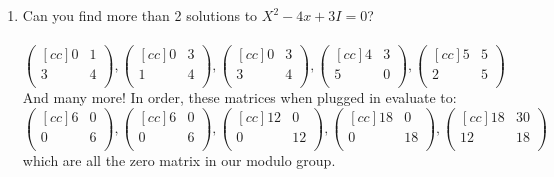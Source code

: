 \begin{enumerate}
\begin{enumerate}
        \item Can you find more than 2 solutions to $X^2 - 4x + 3I = 0$?\\\\
$$          
      \begin{pmatrix}[cc]
        0 & 1 \\
        3 & 4 \\
      \end{pmatrix}, 
      \begin{pmatrix}[cc]
        0 & 3 \\
        1 & 4 \\
      \end{pmatrix},
      \begin{pmatrix}[cc]
        0 & 3 \\
        3 & 4 \\
      \end{pmatrix},
      \begin{pmatrix}[cc]
        4 & 3 \\
        5 & 0 \\
      \end{pmatrix},
      \begin{pmatrix}[cc]
        5 & 5 \\
        2 & 5 \\
      \end{pmatrix}
$$
And many more! In order, these matrices when plugged in evaluate to:
$$
      \begin{pmatrix}[cc]
        6 & 0 \\
        0 & 6 \\
      \end{pmatrix}, 
      \begin{pmatrix}[cc]
        6 & 0 \\
        0 & 6 \\
      \end{pmatrix},
      \begin{pmatrix}[cc]
        12 & 0 \\
        0 & 12 \\
      \end{pmatrix},
      \begin{pmatrix}[cc]
        18 & 0 \\
        0 & 18 \\
      \end{pmatrix},
      \begin{pmatrix}[cc]
        18 & 30 \\
        12 & 18 \\
      \end{pmatrix}
$$
which are all the zero matrix in our modulo group.
    \end{enumerate}

\end{enumerate}

